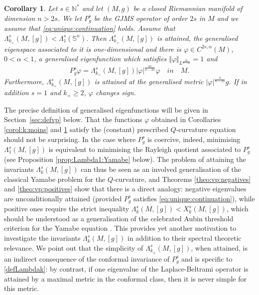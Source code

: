 \documentclass[10pt]{amsart}
\numberwithin{equation}{section}
\def\La{{\Lambda}}
\def\phi{{\varphi}}
\newcommand{\vp}{\varphi}
\theoremstyle{plain}
\newtheorem{corol}[theo]{Corollary}%
\theoremstyle{remark}
\begin{document}
\begin{corol} \label{corol:k:plus}
Let $s \in \mathbb{N}^*$ and let $(M,g)$ be a closed Riemannian manifold of dimension $n > 2s$. We let $P_g^s$ be the GJMS operator of order $2s$ in $M$ and we assume that \eqref{eq:unique:continuation} holds. Assume that $\La_{k_+}^s(M,[g]) <  \Lambda_1^s(\mathbb{S}^n)$. Then $\La_{k_+}^s(M,[g])$ is attained, the generalised eigenspace associated to it is one-dimensional and there is $\varphi \in C^{2s,\alpha}(M)$, $0< \alpha < 1$, a generalised eigenfunction which satisfies $\Vert \vp \Vert_{L^\frac{2n}{n-2s}} = 1$ and  
$$P_g^s\varphi =  \Lambda_{k_+}^s(M,[g])|\varphi|^{\frac{4s}{n-2s}} \phi \quad { in }  \quad M. $$
Furthermore, $ \Lambda_{k_+}^s(M,[g])$ is attained at the generalised metric $|\vp|^{\frac{4}{n-2s}} g$. If in addition $s=1$ and $k_+ \geq 2$, $\varphi$ changes sign. 
\end{corol}


The precise definition of generalised eigenfunctions will be given in Section~\ref{sec:defvp} below. That the functions $\varphi$ obtained in Corollaries \ref{corol:k:moins} and \ref{corol:k:plus} satisfy the (constant) prescribed $Q$-curvature equation should not be surprising. In the case where $P_g^s$ is coercive, indeed, minimising $\Lambda_1^s(M,[g])$ is equivalent to minimising the Rayleigh quotient associated to $P_g^s$ (see Proposition \ref{prop:Lambda1:Yamabe} below).  The problem of attaining the invariants $\Lambda_k^s(M,[g])$ can thus be seen as an involved generalisation of the classical Yamabe problem for the $Q$-curvature, and Theorems \ref{theo:vp:negatives} and \ref{theo:vp:positives} show that there is a direct analogy: negative eigenvalues are unconditionally attained (provided $P_g^s$ satisfies \eqref{eq:unique:continuation}), while positive ones require the strict inequality $\La_k^s(M,[g]) <  X_k^s(M,[g])$, which should be understood as a generalisation of the celebrated Aubin threshold criterion for the Yamabe equation \cite{AubinYamabe}. This provides yet another motivation to investigate the invariants $\Lambda_k^s(M,[g])$ in addition to their spectral theoretic relevance. We point out that the simplicity of $\Lambda_{k_\pm}^s(M,[g])$, when attained, is an indirect consequence of the conformal invariance of $P_g^s$ and is specific to \eqref{defLambdak}: by contrast, if one eigenvalue of the Laplace-Beltrami operator is attained by a maximal metric in the conformal class, then it is never simple for this metric.
\end{document}

